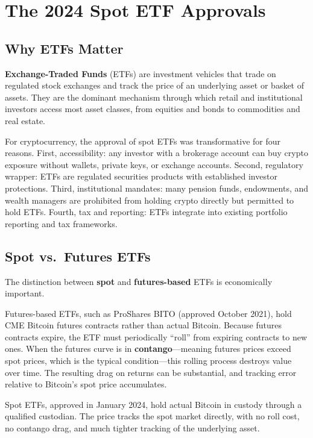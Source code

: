 \documentclass[11pt,a4paper]{article}
\newcommand{\keyword}[1]{\textbf{\textcolor{AccentOrange}{#1}}}
\begin{document}
\section{The 2024 Spot ETF Approvals}

\subsection{Why ETFs Matter}

\keyword{Exchange-Traded Funds} (ETFs) are investment vehicles that trade on regulated stock exchanges and track the price of an underlying asset or basket of assets. They are the dominant mechanism through which retail and institutional investors access most asset classes, from equities and bonds to commodities and real estate.

For cryptocurrency, the approval of spot ETFs was transformative for four reasons. First, accessibility: any investor with a brokerage account can buy crypto exposure without wallets, private keys, or exchange accounts. Second, regulatory wrapper: ETFs are regulated securities products with established investor protections. Third, institutional mandates: many pension funds, endowments, and wealth managers are prohibited from holding crypto directly but permitted to hold ETFs. Fourth, tax and reporting: ETFs integrate into existing portfolio reporting and tax frameworks.

\subsection{Spot vs.\ Futures ETFs}

The distinction between \keyword{spot} and \keyword{futures-based} ETFs is economically important.

Futures-based ETFs, such as ProShares BITO (approved October 2021), hold CME Bitcoin futures contracts rather than actual Bitcoin. Because futures contracts expire, the ETF must periodically ``roll'' from expiring contracts to new ones. When the futures curve is in \keyword{contango}---meaning futures prices exceed spot prices, which is the typical condition---this rolling process destroys value over time. The resulting drag on returns can be substantial, and tracking error relative to Bitcoin's spot price accumulates.

Spot ETFs, approved in January 2024, hold actual Bitcoin in custody through a qualified custodian. The price tracks the spot market directly, with no roll cost, no contango drag, and much tighter tracking of the underlying asset.
\end{document}
